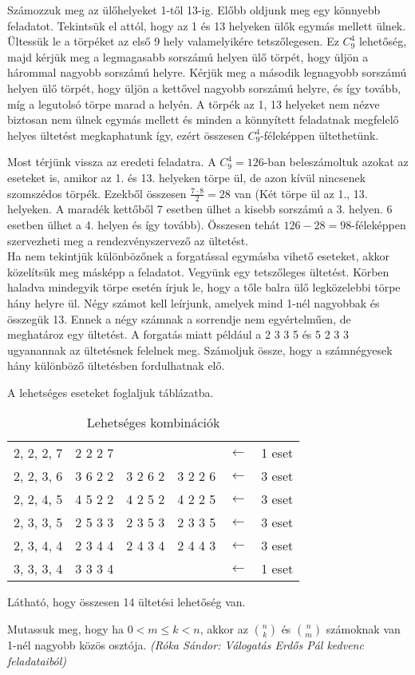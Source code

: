 \begin{solution}
Számozzuk meg az ülőhelyeket 1-től 13-ig. Előbb oldjunk meg egy könnyebb
feladatot. Tekintsük el attól, hogy az 1 és 13 helyeken ülők egymás
mellett ülnek. Ültessük le a törpéket az első 9 hely valamelyikére
tetszőlegesen. Ez $C_{9}^{4}$ lehetőség, majd kérjük meg a legmagasabb
sorszámú helyen ülő törpét, hogy üljön a hárommal nagyobb sorszámú
helyre. Kérjük meg a második legnagyobb sorszámú helyen ülő törpét,
hogy üljön a kettővel nagyobb sorszámú helyre, és így tovább, míg
a legutolsó törpe marad a helyén. A törpék az 1, 13 helyeket nem nézve
biztosan nem ülnek egymás mellett és minden a könnyített feladatnak
megfelelő helyes ültetést megkaphatunk így, ezért összesen $C_{9}^{4}$-féleképpen
ültethetünk.

Most térjünk vissza az eredeti feladatra. A $C_{9}^{4}=126$-ban beleszámoltuk
azokat az eseteket is, amikor az 1. és 13. helyeken törpe ül, de azon
kívül nincsenek szomszédos törpék. Ezekből összesen $\frac{7\cdot8}{2}=28$
van (Két törpe ül az 1., 13. helyeken. A maradék kettőből 7 esetben
ülhet a kisebb sorszámú a 3. helyen. 6 esetben ülhet a 4. helyen és
így tovább). Összesen tehát $126-28=98$-féleképpen szervezheti meg
a rendezvényszervező az ültetést.\\

Ha nem tekintjük különbözőnek a forgatással egymásba vihető eseteket,
akkor közelítsük meg másképp a feladatot. Vegyünk egy tetszőleges
ültetést. Körben haladva mindegyik törpe esetén írjuk le, hogy a tőle
balra ülő legközelebbi törpe hány helyre ül. Négy számot kell leírjunk,
amelyek mind 1-nél nagyobbak és összegük 13. Ennek a négy számnak
a sorrendje nem egyértelműen, de meghatároz egy ültetést. A forgatás
miatt például a 2 3 3 5 és 5 2 3 3 ugyanannak az ültetésnek felelnek
meg. Számoljuk össze, hogy a számnégyesek hány különböző ültetésben
fordulhatnak elő.

A lehetséges eseteket foglaljuk táblázatba.

\begin{table}[h!]
\centering %
\begin{tabular}{|c|ccccc|}
\hline 
2, 2, 2, 7 & 2 2 2 7 &  &  & $\leftarrow$ & 1 eset\tabularnewline
2, 2, 3, 6 & 3 6 2 2 & 3 2 6 2 & 3 2 2 6 & $\leftarrow$ & 3 eset\tabularnewline
2, 2, 4, 5 & 4 5 2 2 & 4 2 5 2 & 4 2 2 5 & $\leftarrow$ & 3 eset\tabularnewline
2, 3, 3, 5 & 2 5 3 3 & 2 3 5 3 & 2 3 3 5 & $\leftarrow$ & 3 eset\tabularnewline
2, 3, 4, 4 & 2 3 4 4 & 2 4 3 4 & 2 4 4 3 & $\leftarrow$ & 3 eset\tabularnewline
3, 3, 3, 4 & 3 3 3 4 &  &  & $\leftarrow$ & 1 eset\tabularnewline
\hline 
\end{tabular}\caption{Lehetséges kombinációk}
\label{tab:my_label}
\end{table}

Látható, hogy összesen 14 ültetési lehetőség van.
\end{solution}
\begin{extraproblem}
Mutassuk meg, hogy ha $0<m\leq k<n$, akkor az $\binom{n}{k}$
és $\binom{n}{m}$ számoknak van 1-nél nagyobb közös osztója. \emph{(Róka
Sándor: Válogatás Erdős Pál kedvenc feladataiból) }
\end{extraproblem}

